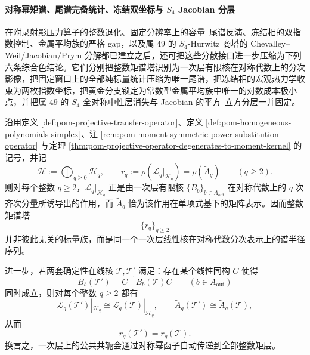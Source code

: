 \paragraph{对称幂矩谱、尾谱完备统计、冻结双坐标与 \texorpdfstring{$S_4$}{S4} Jacobian 分层}
在附录射影压力算子的整数退化、固定分辨率上的容量--尾谱反演、冻结相的双指数控制、金属平均族的严格 gap，以及属 \(49\) 的 \(S_4\)-Hurwitz 商塔的 Chevalley--Weil/Jacobian/Prym 分解都已建立之后，还可把这些分散接口进一步压缩为下列六条综合色结论。它们分别把整数矩谱塔识别为一次层有限核在对称代数上的分次影像，把固定窗口上的全部纯标量统计压缩为唯一尾谱，把冻结相的宏观热力学收束为两枚指数坐标，把黄金分支锁定为常数型金属平均族中唯一的对数成本极小点，并把属 \(49\) 的 \(S_4\)-全对称中性层消失与 Jacobian 的平方--立方分层一并固定。

\begin{theorem}[整数矩谱塔的对称幂封闭与一次层共轭不变性]\label{thm:xi-time-part9xf-moment-tower-symmetric-power-closure}
沿用定义 \ref{def:pom-projective-transfer-operator}、定义 \ref{def:pom-homogeneous-polynomials-simplex}、注 \ref{rem:pom-moment-symmetric-power-substitution-operator} 与定理 \ref{thm:pom-projective-operator-degenerates-to-moment-kernel} 的记号，并记
\[
\mathcal H:=\bigoplus_{q\ge 0}\mathcal H_q,
\qquad
r_q:=\rho(\mathcal L_q|_{\mathcal H_q})=\rho(\widetilde A_q)
\qquad (q\ge 2).
\]
则对每个整数 \(q\ge 2\)，\(\mathcal L_q|_{\mathcal H_q}\) 正是由一次层有限核 \(\{B_b\}_{b\in A_{\mathrm{out}}}\) 在对称代数上的 \(q\) 次齐次分量所诱导出的作用，而 \(\widetilde A_q\) 恰为该作用在单项式基下的矩阵表示。因而整数矩谱塔
\[
\{r_q\}_{q\ge 2}
\]
并非彼此无关的标量族，而是同一个一次层线性核在对称代数分次表示上的谱半径序列。

进一步，若两套确定性在线核 \(\mathcal T,\mathcal T'\) 满足：存在某个线性同构 \(C\) 使得
\[
B_b(\mathcal T')=C^{-1}B_b(\mathcal T)C
\qquad (b\in A_{\mathrm{out}})
\]
同时成立，则对每个整数 \(q\ge 2\) 都有
\[
\mathcal L_q(\mathcal T')|_{\mathcal H_q}
\cong
\mathcal L_q(\mathcal T)|_{\mathcal H_q},
\qquad
\widetilde A_q(\mathcal T')
\cong
\widetilde A_q(\mathcal T),
\]
从而
\[
r_q(\mathcal T')=r_q(\mathcal T).
\]
换言之，一次层上的公共共轭会通过对称幂函子自动传递到全部整数矩层。
\end{theorem}
